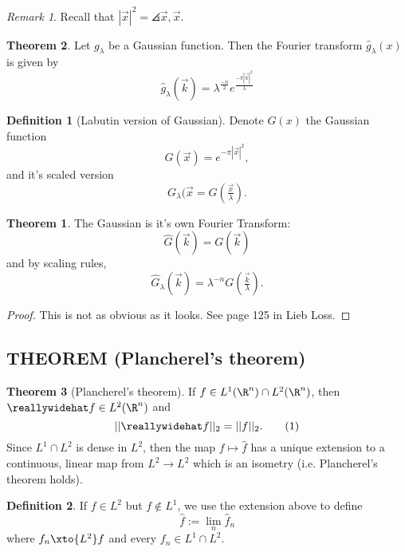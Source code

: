 \documentclass[a5paper]{article}
\theoremstyle{definition}%
\newtheorem{theorem}{Theorem}
\newtheorem*{definition*}{Definition}
\numberwithin{exercise}{section}
\theoremstyle{remark}%
\newtheorem*{remark*}{Remark}
\renewcommand{\L}{L}
\begin{document}
\begin{remark*}
Recall that $|\vec{x}|^2=\angles{\vec{x},\vec{x}}$. 
\end{remark*}

\begin{theorem}
Let $g_\lambda$ be a Gaussian function. Then the Fourier transform $\hat{g}_\lambda(x)$ is given by 
$$\hat{g}_\lambda(\vec{k}) = \lambda^{\frac{-n}{2}}e^{\frac{-\pi|\vec{k}|^2}{\lambda}}
$$

\begin{highlight}
\begin{definition*}[Labutin version of Gaussian]
Denote $G(x)$ the Gaussian function 
$$G(\vec x)=e^{-\pi|\vec{x}|^2},$$
and it's scaled version 
$$G_\lambda(\vec{x}=G\left(\tfrac{\vec x}{\lambda}\right).$$
\end{definition*}
\end{highlight}

\begin{highlight}
\begin{theorem}
The Gaussian is it's own Fourier Transform: 
$$\hat{G}(\vec{k})=G(\vec{k})$$
and by scaling rules, 
$$\hat{G}_\lambda(\vec{k})=\lambda^{-n}G\left(\tfrac{\vec k}{\lambda}\right).$$
\end{theorem}
\end{highlight}
\begin{proof}
This is not as obvious as it looks. See page 125 in Lieb Loss. 
\end{proof}
\end{theorem}

\subsection{THEOREM (Plancherel's theorem)}
\begin{highlight}
\begin{theorem}[Plancherel's theorem]
If $f\in L^1(\R^n)\cap L^2(\R^n)$, then $\hat{f}\in L^2(\R^n)$ and 
\begin{equation}
||\hat{f}||_2=\norm{f}_2. \tag{$1$}
\end{equation}
Since $L^1\cap L^2$ is dense in $L^2$, then the map $f\mapsto\hat{f}$ has a unique extension to a continuous, linear map from $L^2\to L^2$ which is an isometry (i.e. Plancherel's theorem holds). 
\end{theorem}
\end{highlight}
\begin{highlight}
\begin{definition*}
If $f\in L^2$ but $f\not\in \L^1$, we use the extension above to define 
$$\hat{f}:=\lim_n \hat{f}_n$$
where $f_n\xto{L^2}f$ and every $f_n\in L^1\cap L^2$. 
\end{definition*}
\end{highlight}
\end{document}
